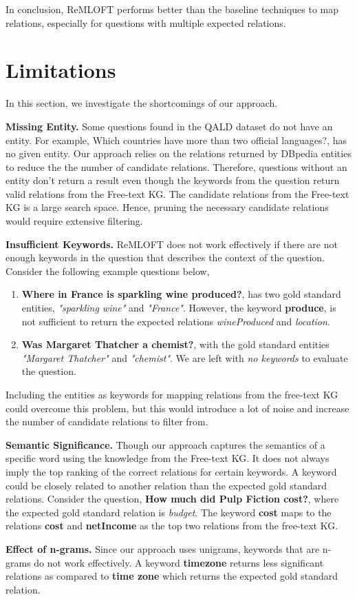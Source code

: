 In conclusion, ReMLOFT performs better than the baseline techniques to map relations, especially for questions with multiple expected relations. 

\section{Limitations}
In this section, we investigate the shortcomings of our approach.

\textbf{Missing Entity.} Some questions found in the QALD dataset do not have an entity. For example, {\selectfont Which countries have more than two official languages?}, has no given entity. Our approach relies on the relations returned by DBpedia entities to reduce the the number of candidate relations. Therefore, questions without an entity don't return a result even though the keywords from the question return valid relations from the Free-text KG. The candidate relations from the Free-text KG is a large search space. Hence, pruning the necessary candidate relations would require extensive filtering. 

\textbf{Insufficient Keywords.} ReMLOFT does not work effectively if there are not enough keywords in the question that describes the context of the question. 
Consider the following example questions below,
\begin{enumerate}
    \item \textbf{Where in France is sparkling wine produced?}, has two gold standard entities, \textit{"sparkling wine"} and \textit{"France"}. However, the keyword \textbf{produce}, is not sufficient to return the expected relations \textit{wineProduced} and \textit{location}. 
    \item \textbf{Was Margaret Thatcher a chemist?}, with the gold standard entities \textit{"Margaret Thatcher"} and \textit{"chemist"}. We are left with \textit{no keywords} to evaluate the question.
\end{enumerate}

Including the entities as keywords for mapping relations from the free-text KG could overcome this problem, but this would introduce a lot of noise and increase the number of candidate relations to filter from.

\textbf{Semantic Significance.} Though our approach captures the semantics of a specific word using the knowledge from the Free-text KG. It does not always imply the top ranking of the correct relations for certain keywords. A keyword could be closely related to another relation than the expected gold standard relations.
Consider the question, \textbf{How much did Pulp Fiction cost?}, where the expected gold standard relation is \textit{budget}. The keyword \textbf{cost} maps to the relations \textbf{cost} and \textbf{netIncome} as the top two relations from the free-text KG.

\textbf{Effect of n-grams.} Since our approach uses unigrams, keywords that are n-grams do not work effectively. A keyword \textbf{timezone} returns less significant relations as compared to \textbf{time zone} which returns the expected gold standard relation.


